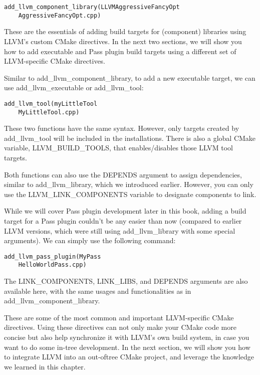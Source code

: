 \begin{lstlisting}[style=styleCMake]
add_llvm_component_library(LLVMAggressiveFancyOpt
	AggressiveFancyOpt.cpp)
\end{lstlisting}

These are the essentials of adding build targets for (component) libraries using LLVM's custom CMake directives. In the next two sections, we will show you how to add executable and Pass plugin build targets using a different set of LLVM-specific CMake directives.


Similar to add\_llvm\_component\_library, to add a new executable target, we can use add\_llvm\_executable or add\_llvm\_tool:

\begin{lstlisting}[style=styleCMake]
add_llvm_tool(myLittleTool
	MyLittleTool.cpp)
\end{lstlisting}

These two functions have the same syntax. However, only targets created by add\_llvm\_tool will be included in the installations. There is also a global CMake variable, LLVM\_BUILD\_TOOLS, that enables/disables those LLVM tool targets.

Both functions can also use the DEPENDS argument to assign dependencies, similar to add\_llvm\_library, which we introduced earlier. However, you can only use the LLVM\_LINK\_COMPONENTS variable to designate components to link.


While we will cover Pass plugin development later in this book, adding a build target for a Pass plugin couldn't be any easier than now (compared to earlier LLVM versions, which were still using add\_llvm\_library with some special arguments). We can simply use the following command:

\begin{lstlisting}[style=styleCMake]
add_llvm_pass_plugin(MyPass
	HelloWorldPass.cpp)
\end{lstlisting}

The LINK\_COMPONENTS, LINK\_LIBS, and DEPENDS arguments are also available here, with the same usages and functionalities as in add\_llvm\_component\_library.

These are some of the most common and important LLVM-specific CMake directives. Using these directives can not only make your CMake code more concise but also help synchronize it with LLVM's own build system, in case you want to do some in-tree development. In the next section, we will show you how to integrate LLVM into an out-oftree CMake project, and leverage the knowledge we learned in this chapter.

